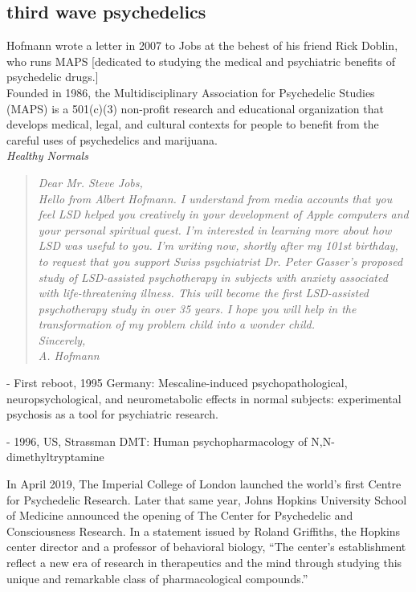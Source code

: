 \documentclass{UIdahoMastersThesis}
\begin{document}
\subsection{third wave psychedelics}

\begin{snugshade*}
{Hofmann wrote a letter in 2007 to Jobs at the behest of his friend Rick Doblin, who runs MAPS [dedicated to studying the medical and psychiatric benefits of psychedelic drugs.]\\
Founded in 1986, the Multidisciplinary Association for Psychedelic Studies (MAPS) is a 501(c)(3) non-profit research and educational organization that develops medical, legal, and cultural contexts for people to benefit from the careful uses of psychedelics and marijuana.}\\
\emph{Healthy Normals}
\end{snugshade*}

\begin{quote}
\textit{{Dear Mr. Steve Jobs,\\
Hello from Albert Hofmann. I understand from media accounts that you feel LSD helped you creatively in your development of Apple computers and your personal spiritual quest. I'm interested in learning more about how LSD was useful to you.
I'm writing now, shortly after my 101st birthday, to request that you support Swiss psychiatrist Dr. Peter Gasser's proposed study of LSD-assisted psychotherapy in subjects with anxiety associated with life-threatening illness. This will become the first LSD-assisted psychotherapy study in over 35 years.
I hope you will help in the transformation of my problem child into a wonder child.\\
Sincerely,\\
A. Hofmann}}
\end{quote}

\begin{snugshade*}
- First reboot, 1995 Germany:
Mescaline-induced psychopathological, neuropsychological, and neurometabolic effects in normal subjects: experimental psychosis as a tool for psychiatric research.
\end{snugshade*}

\begin{snugshade*}
- 1996, US, Strassman DMT:
Human psychopharmacology of N,N-dimethyltryptamine
\end{snugshade*}



In April 2019, The Imperial College of London launched the world's first Centre for Psychedelic Research. Later that same year, Johns Hopkins University School of Medicine announced the opening of The Center for Psychedelic and Consciousness Research. In a statement issued by Roland Griffiths, the Hopkins center director and a professor of behavioral biology, \enquote{The center's establishment reflect a new era of research in therapeutics and the mind through studying this unique and remarkable class of pharmacological compounds.}
\end{document}
